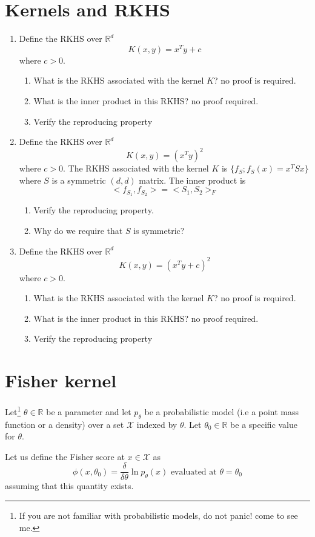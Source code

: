 \documentclass[11pt]{article}
\begin{document}
\section{Kernels and RKHS}
\begin{enumerate}
\item Define the RKHS  over $\mathbb{R}^d$
$$K(x,y)=x^Ty+c$$
where $c>0$. 
\begin{enumerate}
\item
What is the RKHS associated with the kernel $K$? no proof is required. 
\item 
What is the inner product in this RKHS? no proof required.  
\item 
Verify the reproducing property
\end{enumerate}
\item Define the RKHS  over $\mathbb{R}^d$
$$K(x,y)=(x^Ty)^2$$
where $c>0$. 
The RKHS associated with the kernel $K$ is $\{f_S;f_S(x)=x^T S x\}$ where $S$ is a symmetric $(d,d)$ matrix. The inner product is
$$<f_{S_1},f_{S_2}>=<S_1,S_2>_F$$
\begin{enumerate}
\item
Verify the reproducing property. 
\item 
Why do we require that $S$ is symmetric?
\end{enumerate}
\item Define the RKHS  over $\mathbb{R}^d$
$$K(x,y)=(x^Ty+c)^2$$
where $c>0$. 
\begin{enumerate}
\item
What is the RKHS associated with the kernel $K$? no proof is required. 
\item 
What is the inner product in this RKHS? no proof required.  
\item 
Verify the reproducing property
\end{enumerate}
\end{enumerate}
\section{Fisher kernel} 
Let\footnote{If you are not familiar with probabilistic models, do not panic! come to see me.} $\theta \in \mathbb{R}$ be a parameter and let $p_\theta$ be a probabilistic model (i.e a point mass function or a density) over a set $\mathcal{X}$ indexed by $\theta$. Let $\theta_0 \in \mathbb{R}$ be a specific value for $\theta$.

Let us define the Fisher score at $x \in \mathcal{X}$ as
\begin{equation}
\phi(x,\theta_0) = \frac{\delta}{\delta \theta} \ln p_\theta(x) \mbox{ evaluated at } \theta=\theta_0
\end{equation}
assuming that this quantity exists. 
\end{document}
